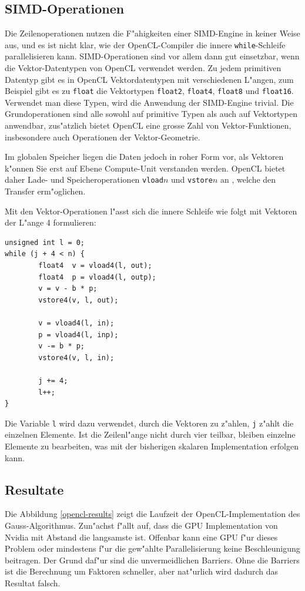 \subsection{SIMD-Operationen}
Die Zeilenoperationen nutzen die F"ahigkeiten einer SIMD-Engine in keiner
Weise aus, und es ist nicht klar, wie der OpenCL-Compiler die innere
{\tt while}-Schleife parallelisieren kann. 
SIMD-Operationen sind vor allem dann gut einsetzbar, wenn die Vektor-Datentypen
von OpenCL verwendet werden.
Zu jedem primitiven Datentyp gibt es in OpenCL Vektordatentypen mit
verschiedenen L"angen,
zum Beispiel gibt es zu {\tt float} die Vektortypen {\tt float2},
{\tt float4}, {\tt float8}  und {\tt float16}.
Verwendet man diese Typen, wird die Anwendung der SIMD-Engine trivial.
Die Grundoperationen sind alle sowohl auf primitive Typen als auch auf
Vektortypen anwendbar, zus"atzlich bietet OpenCL eine grosse Zahl von
Vektor-Funktionen, insbesondere auch Operationen der Vektor-Geometrie.

Im globalen Speicher liegen die Daten jedoch in roher Form vor, als Vektoren
k"onnen Sie erst auf Ebene Compute-Unit verstanden werden.
OpenCL bietet daher Lade- und Speicheroperationen {\tt vload}$n$ und
{\tt vstore}$n$ an , welche den Transfer erm"oglichen.

Mit den Vektor-Operationen l"asst sich die innere Schleife wie folgt
mit Vektoren der L"ange 4 formulieren:
\begin{verbatim}
unsigned int l = 0;
while (j + 4 < n) {
        float4  v = vload4(l, out);
        float4  p = vload4(l, outp);
        v = v - b * p;
        vstore4(v, l, out);

        v = vload4(l, in);
        p = vload4(l, inp);
        v -= b * p;
        vstore4(v, l, in);

        j += 4;
        l++;
}
\end{verbatim}
Die Variable {\tt l} wird dazu verwendet, durch die Vektoren zu
z"ahlen, {\tt j} z"ahlt die einzelnen Elemente.
Ist die Zeilenl"ange nicht durch vier teilbar, bleiben einzelne 
Elemente zu bearbeiten, was mit der bisherigen skalaren Implementation
erfolgen kann.

\subsection{Resultate}
Die Abbildung \ref{opencl-results} zeigt die Laufzeit der OpenCL-Implementation
des Gauss-Algorithmus. Zun"achst f"allt auf, dass die GPU Implementation
von Nvidia mit Abstand die langsamste ist.
Offenbar kann eine GPU f"ur dieses Problem oder mindestens f"ur die
gew"ahlte Parallelisierung keine Beschleunigung beitragen.
Der Grund daf"ur sind die unvermeidlichen Barriers.
Ohne die Barriers ist die Berechnung um Faktoren schneller, aber nat"urlich
wird dadurch das Resultat falsch.

